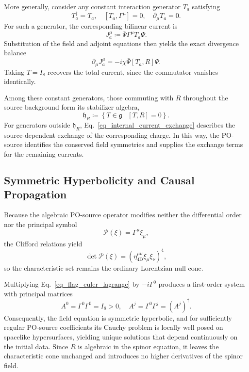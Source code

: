 More generally, consider any constant interaction generator $T_{a}$ satisfying
\begin{equation}\label{eq_current_generator_conditions}
    T_{a}^{\ddagger} = T_{a}, \quad [T_{a}, \Gamma^{\mu}] = 0, \quad \partial_{\mu}T_{a} = 0.
\end{equation}
For such a generator, the corresponding bilinear current is
\begin{equation}\label{eq_internal_noether_current}
    J_{a}^{\mu} \coloneqq \bar{\Psi}\Gamma^{\mu}T_{a}\Psi.
\end{equation}
Substitution of the field and adjoint equations then yields the exact divergence balance
\begin{equation}\label{eq_internal_current_exchange}
    \partial_{\mu}J_{a}^{\mu} = -i\chi\bar{\Psi}[T_{a}, R]\Psi.
\end{equation}
Taking $T=I_{8}$ recovers the total current, since the commutator vanishes identically.

Among these constant generators, those commuting with $R$ throughout the source background form its stabilizer algebra,
\begin{equation}\label{eq_R_stabilizer_algebra}
    \mathfrak{h}_{R} \coloneqq \left\{T \in \mathfrak{g} \mid [T, R] = 0\right\}.
\end{equation}
For generators outside $\mathfrak{h}_{R}$, Eq.~\eqref{eq_internal_current_exchange} describes the source-dependent exchange of the corresponding charge. In this way, the PO-source identifies the conserved field symmetries and supplies the exchange terms for the remaining currents.

\subsection{Symmetric Hyperbolicity and Causal Propagation}
Because the algebraic PO-source operator modifies neither the differential order nor the principal symbol
\begin{equation}
    \mathcal{P}(\xi) = \Gamma^{\mu}\xi_{\mu},
\end{equation}
the Clifford relations yield
\begin{equation}
    \det\mathcal{P}(\xi) = \left(\eta_{\mathrm{4D}}^{\mu\nu}\xi_{\mu}\xi_{\nu}\right)^{4},
\end{equation}
so the characteristic set remains the ordinary Lorentzian null cone.

Multiplying Eq.~\eqref{eq_flag_euler_lagrange} by $-i\Gamma^{0}$ produces a first-order system with principal matrices
\begin{equation}
    A^{0} = \Gamma^{0}\Gamma^{0} = I_{8} > 0, \quad A^{j} = \Gamma^{0}\Gamma^{j} = \left(A^{j}\right)^{\dagger}.
\end{equation}
Consequently, the field equation is symmetric hyperbolic, and for sufficiently regular PO-source coefficients its Cauchy problem is locally well posed on spacelike hypersurfaces, yielding unique solutions that depend continuously on the initial data. Since $R$ is algebraic in the spinor equation, it leaves the characteristic cone unchanged and introduces no higher derivatives of the spinor field.

